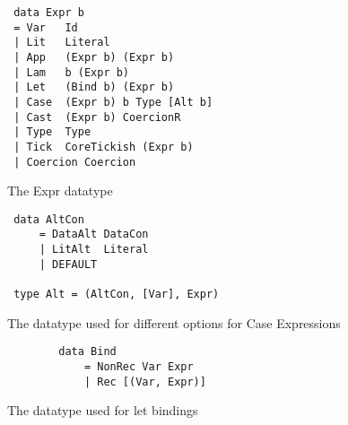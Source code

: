 \begin{figure}[ht!]
\begin{verbatim}
 data Expr b
 = Var   Id
 | Lit   Literal
 | App   (Expr b) (Expr b)
 | Lam   b (Expr b)
 | Let   (Bind b) (Expr b)
 | Case  (Expr b) b Type [Alt b]
 | Cast  (Expr b) CoercionR
 | Type  Type
 | Tick  CoreTickish (Expr b)
 | Coercion Coercion
\end{verbatim}
    \caption{The Expr datatype}
\end{figure}

\begin{figure}[ht!]
\begin{verbatim}
 data AltCon
     = DataAlt DataCon
     | LitAlt  Literal
     | DEFAULT
 
 type Alt = (AltCon, [Var], Expr)
\end{verbatim}
    \caption{The datatype used for different options for Case Expressions}
\end{figure}

\begin{figure}[ht!]
    \begin{verbatim}
        data Bind
            = NonRec Var Expr
            | Rec [(Var, Expr)]
    \end{verbatim}
    \caption{The datatype used for let bindings}
\end{figure}

